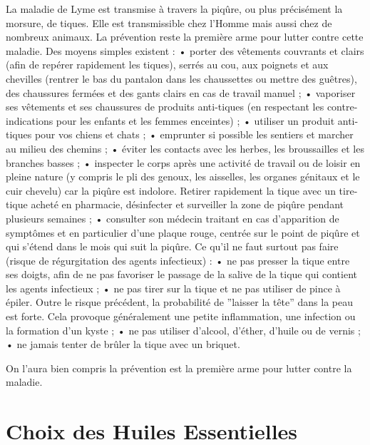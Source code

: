 \documentclass[12pt,a4wide]{article}
\begin{document}
La maladie de Lyme est transmise à travers la piqûre, ou plus précisément la morsure, de tiques. Elle est transmissible chez l'Homme mais aussi chez de nombreux animaux. 
La prévention reste la première arme pour lutter contre cette maladie.
Des moyens simples existent :
    • porter des vêtements couvrants et clairs (afin de repérer rapidement les tiques), serrés au cou, aux poignets et aux chevilles (rentrer le bas du pantalon dans les chaussettes ou mettre des guêtres), des chaussures fermées et des gants clairs en cas de travail manuel ; 
    • vaporiser ses vêtements et ses chaussures de produits anti-tiques (en respectant les contre-indications pour les enfants et les femmes enceintes) ; 
    • utiliser un produit anti-tiques pour vos chiens et chats ; 
    • emprunter si possible les sentiers et marcher au milieu des chemins ; 
    • éviter les contacts avec les herbes, les broussailles et les branches basses ; 
    • inspecter le corps après une activité de travail ou de loisir en pleine nature (y compris le pli des genoux, les aisselles, les organes génitaux et le cuir chevelu) car la piqûre est indolore. Retirer rapidement la tique avec un tire-tique acheté en pharmacie, désinfecter et surveiller la zone de piqûre pendant plusieurs semaines ; 
    • consulter son médecin traitant en cas d'apparition de symptômes et en particulier d'une plaque rouge, centrée sur le point de piqûre et qui s'étend dans le mois qui suit la piqûre. 
Ce qu'il ne faut surtout pas faire (risque de régurgitation des agents infectieux) :
    • ne pas presser la tique entre ses doigts, afin de ne pas favoriser le passage de la salive de la tique qui contient les agents infectieux ; 
    • ne pas tirer sur la tique et ne pas utiliser de pince à épiler. Outre le risque précédent, la probabilité de ''laisser la tête'' dans la peau est forte. Cela provoque généralement une petite inflammation, une infection ou la formation d'un kyste ; 
    • ne pas utiliser d'alcool, d'éther, d'huile ou de vernis ; 
    • ne jamais tenter de brûler la tique avec un briquet. 


On l'aura bien compris la prévention est la première arme pour lutter contre la maladie.

\section{Choix des Huiles Essentielles}
\label{sec-4}
\end{document}
